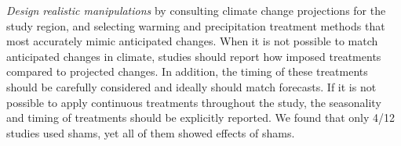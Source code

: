 \documentclass{article}
\begin{document}
\par\textit{Design realistic manipulations} by consulting climate change projections for the study region, and selecting warming and precipitation treatment methods that most accurately mimic anticipated changes. When it is not possible to match anticipated changes in climate, studies should report how imposed treatments compared to projected changes. In addition, the timing of these treatments should be carefully considered and ideally should match forecasts. If it is not possible to apply continuous treatments throughout the study, the seasonality and timing of treatments should be explicitly reported. We found that only 4/12 studies used shams, yet all of them showed effects of shams. %
\end{document}

